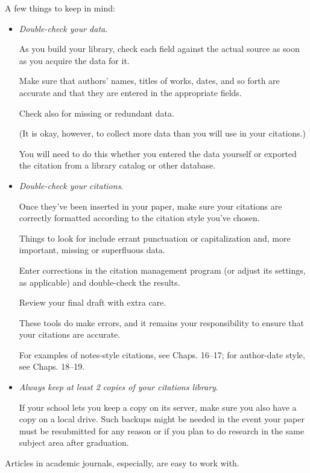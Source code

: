 \documentclass[oneside]{book}
\numberwithin{equation}{section}
\begin{document}
A few things to keep in mind:
\begin{itemize}
    \item \textit{Double-check your data}.
    
    As you build your library, check each field against the actual source as soon as you acquire the data for it.
    
    Make sure that authors' names, titles of works, dates, and so forth are accurate and that they are entered in the appropriate fields.
    
    Check also for missing or redundant data.
    
    (It is okay, however, to collect more data than you will use in your citations.)
    
    You will need to do this whether you entered the data yourself or exported the citation from a library catalog or other database.
    \item \textit{Double-check your citations}.
    
    Once they've been inserted in your paper, make sure your citations are correctly formatted according to the citation style you've chosen.
    
    Things to look for include errant punctuation or capitalization and, more important, missing or superfluous data.
    
    Enter corrections in the citation management program (or adjust its settings, as applicable) and double-check the results.
    
    Review your final draft with extra care.
    
    These tools do make errors, and it remains your responsibility to ensure that your citations are accurate.
    
    For examples of notes-style citations, see Chaps. 16--17; for author-date style, see Chaps. 18--19.
    \item \textit{Always keep at least 2 copies of your citations library}.
    
    If your school lets you keep a copy on its server, make sure you also have a copy on a local drive. Such backups might be needed in the event your paper must be resubmitted for any reason or if you plan to do research in the same subject area after graduation.
\end{itemize}

Articles in academic journals, especially, are easy to work with.
\end{document}
